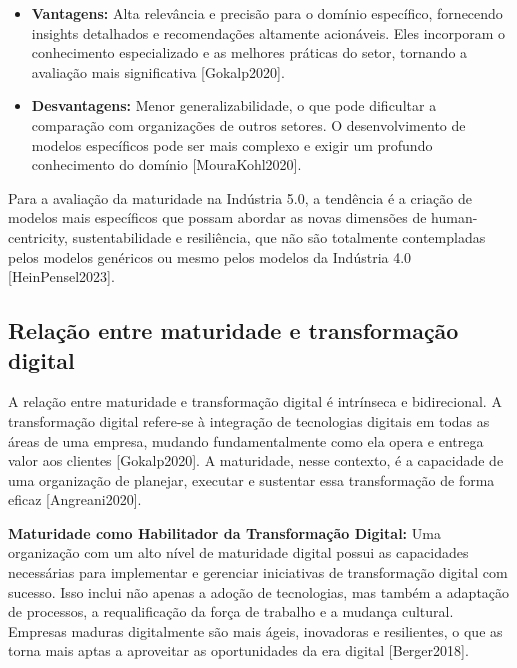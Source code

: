 \begin{itemize}
    \item \textbf{Vantagens:} Alta relevância e precisão para o domínio específico, fornecendo insights detalhados e recomendações altamente acionáveis. Eles incorporam o conhecimento especializado e as melhores práticas do setor, tornando a avaliação mais significativa [Gokalp2020].
    \item \textbf{Desvantagens:} Menor generalizabilidade, o que pode dificultar a comparação com organizações de outros setores. O desenvolvimento de modelos específicos pode ser mais complexo e exigir um profundo conhecimento do domínio [MouraKohl2020].
\end{itemize}

Para a avaliação da maturidade na Indústria 5.0, a tendência é a criação de modelos mais específicos que possam abordar as novas dimensões de human-centricity, sustentabilidade e resiliência, que não são totalmente contempladas pelos modelos genéricos ou mesmo pelos modelos da Indústria 4.0 [HeinPensel2023].

\subsection{Relação entre maturidade e transformação digital}

A relação entre maturidade e transformação digital é intrínseca e bidirecional. A transformação digital refere-se à integração de tecnologias digitais em todas as áreas de uma empresa, mudando fundamentalmente como ela opera e entrega valor aos clientes [Gokalp2020]. A maturidade, nesse contexto, é a capacidade de uma organização de planejar, executar e sustentar essa transformação de forma eficaz [Angreani2020].

\textbf{Maturidade como Habilitador da Transformação Digital:}
Uma organização com um alto nível de maturidade digital possui as capacidades necessárias para implementar e gerenciar iniciativas de transformação digital com sucesso. Isso inclui não apenas a adoção de tecnologias, mas também a adaptação de processos, a requalificação da força de trabalho e a mudança cultural. Empresas maduras digitalmente são mais ágeis, inovadoras e resilientes, o que as torna mais aptas a aproveitar as oportunidades da era digital [Berger2018].

